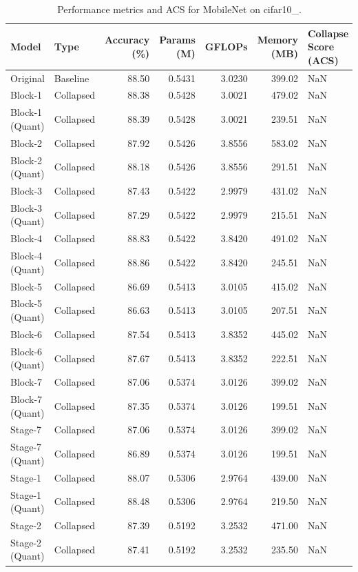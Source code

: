 \begin{table}
\caption{Performance metrics and ACS for MobileNet on cifar10_.}
\label{tab:MobileNet_cifar10_}
\begin{tabular}{llrrrrl}
\toprule
Model & Type & Accuracy (\%) & Params (M) & GFLOPs & Memory (MB) & Collapse Score (ACS) \\
\midrule
Original & Baseline & 88.50 & 0.5431 & 3.0230 & 399.02 & NaN \\
Block-1 & Collapsed & 88.38 & 0.5428 & 3.0021 & 479.02 & NaN \\
Block-1
(Quant) & Collapsed & 88.39 & 0.5428 & 3.0021 & 239.51 & NaN \\
Block-2 & Collapsed & 87.92 & 0.5426 & 3.8556 & 583.02 & NaN \\
Block-2
(Quant) & Collapsed & 88.18 & 0.5426 & 3.8556 & 291.51 & NaN \\
Block-3 & Collapsed & 87.43 & 0.5422 & 2.9979 & 431.02 & NaN \\
Block-3
(Quant) & Collapsed & 87.29 & 0.5422 & 2.9979 & 215.51 & NaN \\
Block-4 & Collapsed & 88.83 & 0.5422 & 3.8420 & 491.02 & NaN \\
Block-4
(Quant) & Collapsed & 88.86 & 0.5422 & 3.8420 & 245.51 & NaN \\
Block-5 & Collapsed & 86.69 & 0.5413 & 3.0105 & 415.02 & NaN \\
Block-5
(Quant) & Collapsed & 86.63 & 0.5413 & 3.0105 & 207.51 & NaN \\
Block-6 & Collapsed & 87.54 & 0.5413 & 3.8352 & 445.02 & NaN \\
Block-6
(Quant) & Collapsed & 87.67 & 0.5413 & 3.8352 & 222.51 & NaN \\
Block-7 & Collapsed & 87.06 & 0.5374 & 3.0126 & 399.02 & NaN \\
Block-7
(Quant) & Collapsed & 87.35 & 0.5374 & 3.0126 & 199.51 & NaN \\
Stage-7 & Collapsed & 87.06 & 0.5374 & 3.0126 & 399.02 & NaN \\
Stage-7
(Quant) & Collapsed & 86.89 & 0.5374 & 3.0126 & 199.51 & NaN \\
Stage-1 & Collapsed & 88.07 & 0.5306 & 2.9764 & 439.00 & NaN \\
Stage-1
(Quant) & Collapsed & 88.48 & 0.5306 & 2.9764 & 219.50 & NaN \\
Stage-2 & Collapsed & 87.39 & 0.5192 & 3.2532 & 471.00 & NaN \\
Stage-2
(Quant) & Collapsed & 87.41 & 0.5192 & 3.2532 & 235.50 & NaN \\

\end{tabular}
\end{table}

